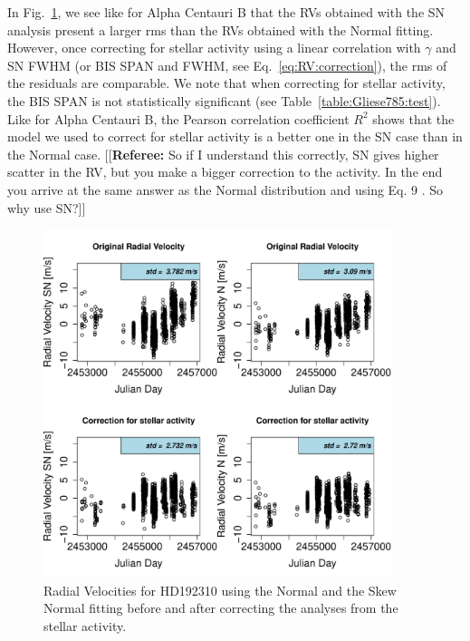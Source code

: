 \documentclass[11pt, oneside]{article}
\newcommand{\comment}[1]{{\color{red}[[\textbf{Referee: }#1]]}}
\begin{document}
In Fig.~\ref{fig:Gliese785:correctionRV}, we see like for Alpha Centauri B that the RVs obtained with the SN analysis present a larger rms than the RVs obtained with the Normal fitting. However, once correcting for stellar activity using a linear correlation with $\gamma$ and SN FWHM (or BIS SPAN and FWHM, see Eq.~\ref{eq:RV:correction}), the rms of the residuals are comparable. We note that when correcting for stellar activity, the BIS SPAN is not statistically significant (see Table~\ref{table:Gliese785:test}). Like for Alpha Centauri B, the Pearson correlation coefficient $R^{2}$ shows  that the model we used to correct for stellar activity is a better one in the SN case than in the Normal case.
\comment{So if I understand this correctly, SN gives higher scatter in the RV, but you make a bigger correction to the activity. In the end you arrive at the same answer as the Normal distribution and using Eq. 9 . So why use SN?}
%
\begin{figure}[htbp]
   \centering
\includegraphics[height = 4in]{HD19231_[3]CorrectionActivity_RadialVelocity_vs_time.pdf} 
   \caption{Radial Velocities for HD192310 using the Normal and the Skew Normal fitting before and after correcting the analyses from the stellar activity.}
   \label{fig:Gliese785:correctionRV}
\end{figure}
%
\end{document}
